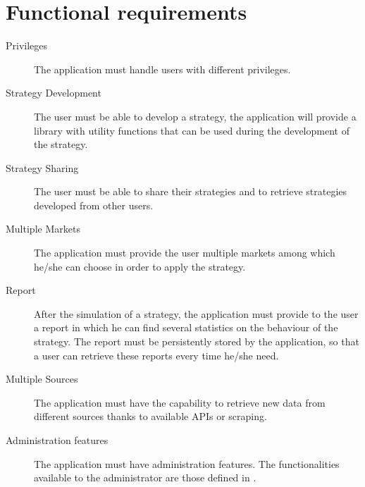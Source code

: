 \section{Functional requirements}\label{sec:functionalrequirements}

\begin{description}
	\item[Privileges] The application must handle users with different
		privileges.
	\item[Strategy Development] The user must be able to develop a strategy,
		the application will provide a library with utility functions
		that can be used during the development of the strategy.
	\item[Strategy Sharing] The user must be able to share their strategies
		and to retrieve strategies developed from other users.
	\item[Multiple Markets] The application must provide the user multiple
		markets among which he/she can choose in order to apply the
		strategy.
	\item[Report] After the simulation of a strategy, the application must
		provide to the user a report in which he can find several
		statistics on the behaviour of the strategy. The report must be
		persistently stored by the application, so that a user can
		retrieve these reports every time he/she need.
	\item[Multiple Sources] The application must have the capability to
		retrieve new data from different sources thanks to available
		APIs or scraping.
	\item[Administration features] The application must have
		administration features. The functionalities available to the
		administrator are those defined in .
\end{description}
